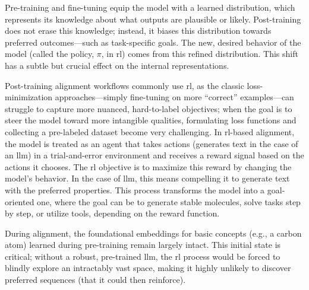 Pre-training and fine-tuning equip the model with a learned distribution, which represents its knowledge about what outputs are plausible or likely. 
Post-training does not erase this knowledge; instead, it biases this distribution towards preferred outcomes---such as task-specific goals. 
The new, desired behavior of the model (called the policy, $\pi$, in \gls{rl}) comes from this refined distribution.
This shift has a subtle but crucial effect on the internal representations. 

Post-training alignment workflows commonly use \gls{rl}, as the classic loss-minimization approaches---simply fine-tuning on more \enquote{correct} examples---can struggle to capture more nuanced, hard-to-label objectives\autocite{Huan2025mathLLM}; when the goal is to steer the model toward more intangible qualities, formulating loss functions and collecting a pre-labeled dataset become very challenging. 
In \gls{rl}-based alignment, the model is treated as an agent that takes actions (generates text in the case of an \gls{llm}) in a trial-and-error environment and receives a reward signal based on the actions it chooses. 
The \gls{rl} objective is to maximize this reward by changing the model's behavior. In the case of \gls{llm}, this means compelling it to generate text with the preferred properties. 
This process transforms the model into a goal-oriented one, where the goal can be to generate stable molecules, solve tasks step by step, or utilize tools, depending on the reward function.

During alignment, the foundational embeddings for basic concepts (e.g., a carbon atom) learned during pre-training remain largely intact. 
This initial state is critical; without a robust, pre-trained \gls{llm}, the \gls{rl} process would be forced to blindly explore an intractably vast space, making it highly unlikely to discover preferred sequences (that it could then reinforce).   
 
